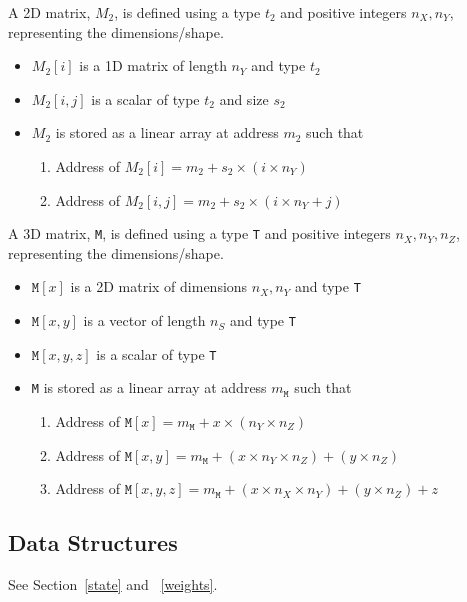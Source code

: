 \documentclass[letterpaper,12pt]{article}
\begin{document}
\begin{definition}
  \label{2D_matrix}
  A 2D matrix, \(M_2\),  is defined using a type \(t_2\) and positive integers 
\(n_X, n_Y\), representing the dimensions/shape.
\begin{itemize}
  \item \(M_2[i]\) is a 1D matrix of length \(n_Y\) and type \(t_2\)
  \item \(M_2[i, j]\) is a scalar of type \(t_2\) and size \(s_2\)
  \item \(M_2\) is stored as a linear array at address \(m_2\)
  such that 
    \begin{enumerate} 
      \item Address of \(M_2[i] = m_2 + s_2 \times (i \times n_Y)\)
      \item Address of \(M_2[i, j] = m_2 + 
        s_2 \times (i \times n_Y + j)\)
\end{enumerate}
\end{itemize}
\end{definition}

\begin{definition}
  \label{3D_matrix}
  A 3D matrix, {\tt M}, is defined using a type {\tt T} and positive integers 
\(n_X, n_Y, n_Z\), representing the dimensions/shape.
\begin{itemize}
  \item \(\mathtt{M}[x]\) is a 2D matrix of dimensions \(n_X, n_Y\) and type
    {\tt T}
  \item \(\mathtt{M}[x, y]\) is a vector of length \(n_S\) and type {\tt T}
\item \(\mathtt{M}[x, y, z]\) is a scalar of type {\tt T}
\item {\tt M} is stored as a linear array at address \(m_{\mathtt{M}}\)
  such that 
    \begin{enumerate} 
    \item Address of \(\mathtt{M}[x] = 
  m_{\mathtt{M}} + x \times (n_Y \times n_Z)\)
\item Address of \(\mathtt{M}[x, y]  = 
  m_{\mathtt{M}} + (x \times n_Y \times n_Z) + (y \times n_Z)\)
\item Address of \(\mathtt{M}[x, y, z] = 
  m_{\mathtt{M}} + (x \times n_X \times n_Y) + (y \times n_Z) + z\)
\end{enumerate}
\end{itemize}
\end{definition}

\clearpage
\subsection{Data Structures}
See Section~\ref{state} and ~\ref{weights}.
\end{document}
